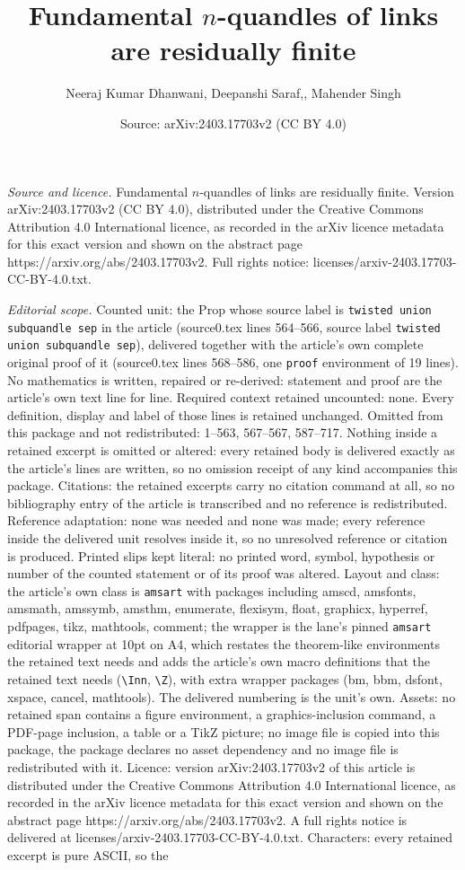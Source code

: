 \documentclass[10pt,a4paper]{amsart}
\title[Fundamental $n$-quandles of links are residually finite]{Fundamental $n$-quandles of links are residually finite}
\author{Neeraj Kumar Dhanwani, Deepanshi Saraf,, Mahender Singh}
\date{Source: arXiv:2403.17703v2 (CC BY 4.0)}
\begin{document}
\maketitle

\noindent\emph{Source and licence.} Fundamental $n$-quandles of links are residually finite. Version arXiv:2403.17703v2 (CC BY 4.0), distributed under the Creative Commons Attribution 4.0 International licence, as recorded in the arXiv licence metadata for this exact version and shown on the abstract page https://arxiv.org/abs/2403.17703v2. Full rights notice: licenses/arxiv-2403.17703-CC-BY-4.0.txt.\par\smallskip

\noindent\textit{Editorial scope.} Counted unit: the Prop whose source label is \texttt{twisted union subquandle sep} in the article (source0.tex lines 564--566, source label \texttt{twisted union subquandle sep}), delivered together with the article's own complete original proof of it (source0.tex lines 568--586, one \texttt{proof} environment of 19 lines). No mathematics is written, repaired or re-derived: statement and proof are the article's own text line for line. Required context retained uncounted: none. Every definition, display and label of those lines is retained unchanged. Omitted from this package and not redistributed: 1--563, 567--567, 587--717. Nothing inside a retained excerpt is omitted or altered: every retained body is delivered exactly as the article's lines are written, so no omission receipt of any kind accompanies this package. Citations: the retained excerpts carry no citation command at all, so no bibliography entry of the article is transcribed and no reference is redistributed. Reference adaptation: none was needed and none was made; every reference inside the delivered unit resolves inside it, so no unresolved reference or citation is produced. Printed slips kept literal: no printed word, symbol, hypothesis or number of the counted statement or of its proof was altered. Layout and class: the article's own class is \texttt{amsart} with packages including amscd, amsfonts, amsmath, amssymb, amsthm, enumerate, flexisym, float, graphicx, hyperref, pdfpages, tikz, mathtools, comment; the wrapper is the lane's pinned \texttt{amsart} editorial wrapper at 10pt on A4, which restates the theorem-like environments the retained text needs and adds the article's own macro definitions that the retained text needs (\texttt{\textbackslash Inn}, \texttt{\textbackslash Z}), with extra wrapper packages (bm, bbm, dsfont, xspace, cancel, mathtools). The delivered numbering is the unit's own. Assets: no retained span contains a figure environment, a graphics-inclusion command, a PDF-page inclusion, a table or a TikZ picture; no image file is copied into this package, the package declares no asset dependency and no image file is redistributed with it. Licence: version arXiv:2403.17703v2 of this article is distributed under the Creative Commons Attribution 4.0 International licence, as recorded in the arXiv licence metadata for this exact version and shown on the abstract page https://arxiv.org/abs/2403.17703v2. A full rights notice is delivered at licenses/arxiv-2403.17703-CC-BY-4.0.txt. Characters: every retained excerpt is pure ASCII, so the 
\end{document}
